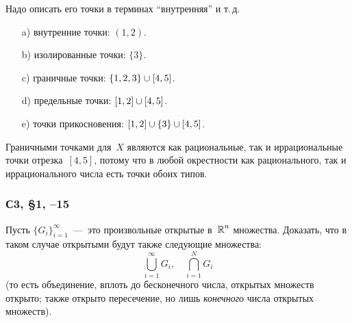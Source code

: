 \documentclass[a4paper,12pt]{article}
\begin{document}
  Надо описать его точки в терминах ``внутренняя'' и т.\,д.
  
  \begin{solution}
    \par\mbox{}
    \begin{enumerate}  %
        \item[a)] внутренние точки: $(1, 2)$.
        \item[b)] изолированные точки: $\{3\}$.
        \item[c)] граничные точки: $\{1, 2, 3\} \hm\cup [4, 5]$.
        \item[d)] предельные точки: $[1, 2] \hm\cup [4, 5]$.
        \item[e)] точки прикосновения: $[1, 2] \hm\cup \{3\} \hm\cup [4, 5]$.
    \end{enumerate}

    Граничными точками для~$X$ являются как рациональные, так и иррациональные точки отрезка~$[4, 5]$, потому что в любой окрестности как рационального, так и иррационального числа есть точки обоих типов.
  \end{solution}

  
  \subsubsection{С3, \S 1, --15}  %

  Пусть $\{G_i\}_{i = 1}^{\infty}$~---~это произвольные открытые в~$\operatorname{\mathbb R}^n$ множества.
  Доказать, что в таком случае открытыми будут также следующие множества:
  \[
    \bigcup_{i = 1}^{\infty} G_i,\quad \bigcap_{i = 1}^N G_i
  \]
  (то есть объединение, вплоть до бесконечного числа, открытых множеств открыто; также открыто пересечение, но лишь \emph{конечного} числа открытых множеств).
  
\end{document}
